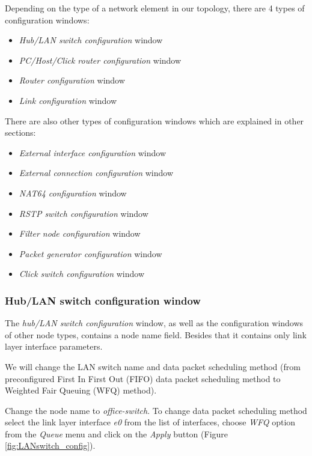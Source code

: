 Depending on the type of a network element in our topology, there are 4 types
of configuration windows:

\begin{itemize}
  \item \emph{Hub/LAN switch configuration} window
  \item \emph{PC/Host/Click router configuration} window
  \item \emph{Router configuration} window
  \item \emph{Link configuration} window
\end{itemize}

There are also other types of configuration windows which are explained in
other sections:

\begin{itemize}
  \item \emph{External interface configuration} window
  \item \emph{External connection configuration} window
  \item \emph{NAT64 configuration} window
  \item \emph{RSTP switch configuration} window
  \item \emph{Filter node configuration} window
  \item \emph{Packet generator configuration} window
  \item \emph{Click switch configuration} window
\end{itemize}

\subsubsection{Hub/LAN switch configuration window}
The \emph{hub/LAN switch configuration} window, as well as the configuration
windows of other node types, contains a node name field. Besides that it
contains only link layer interface parameters.

We will change the LAN switch name and data packet scheduling method (from
preconfigured First In First Out (FIFO) data packet scheduling method to
Weighted Fair Queuing (WFQ) method).

Change the node name to \emph{office-switch}.
To change data packet scheduling method select the link layer interface
\emph{e0} from the list of interfaces, choose \emph{WFQ} option from the
\emph{Queue} menu and click on the \emph{Apply} button (Figure
\ref{fig:LANswitch_config}). 

